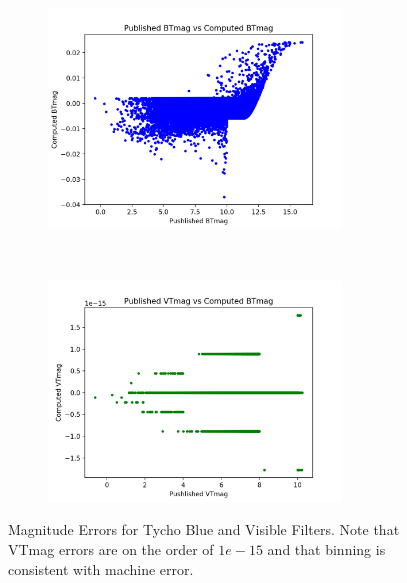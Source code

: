 \documentclass[]{DINOReportMemo}
\begin{document}
\begin{figure}[t!]
    \centering
    \begin{subfigure}
        \centering
        \includegraphics[height=2.3in]{btmag_error}
    \end{subfigure}%
    ~ 
    \begin{subfigure}
        \centering
        \includegraphics[height=2.3in]{vtmag_error}
    \end{subfigure}
    \caption{Magnitude Errors for Tycho Blue and Visible Filters. Note that VTmag errors are on the order of $1e-15$ and that binning is consistent with machine error.}
\end{figure}
\end{document}
